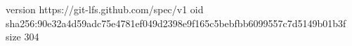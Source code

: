 version https://git-lfs.github.com/spec/v1
oid sha256:90e32a4d59adc75e4781ef049d2398e9f165c5bebfbb6099557c7d5149b01b3f
size 304
